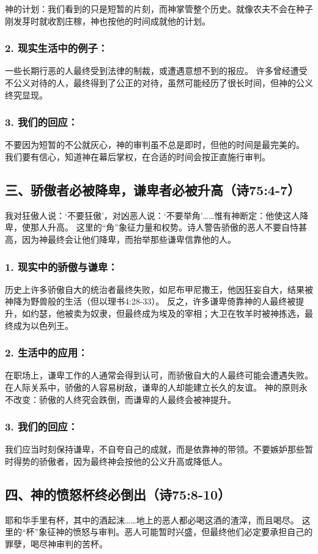 \documentclass[a4paper, 12pt]{article}
\begin{document}
神的计划：我们看到的只是短暂的片刻，而神掌管整个历史。就像农夫不会在种子刚发芽时就收割庄稼，神也按他的时间成就他的计划。
\subsubsection*{2. 现实生活中的例子：}
一些长期行恶的人最终受到法律的制裁，或遭遇意想不到的报应。
许多曾经遭受不公义对待的人，最终得到了公正的对待，虽然可能经历了很长时间，但神的公义终究显现。
\subsubsection*{3. 我们的回应：}
不要因为短暂的不公就灰心，神的审判虽不总是即时，但他的时间是最完美的。 我们要有信心，知道神在幕后掌权，在合适的时间会按正直施行审判。
\subsection*{三、骄傲者必被降卑，谦卑者必被升高（诗75:4-7）}
我对狂傲人说：‘不要狂傲’，对凶恶人说：‘不要举角’……惟有神断定：他使这人降卑，使那人升高。
这里的“角”象征力量和权势。诗人警告骄傲的恶人不要自恃甚高，因为神最终会让他们降卑，而抬举那些谦卑信靠他的人。
\subsubsection*{1. 现实中的骄傲与谦卑：}
历史上许多骄傲自大的统治者最终失败，如尼布甲尼撒王，他因狂妄自大，结果被神降为野兽般的生活（但以理书4:28-33）。
反之，许多谦卑倚靠神的人最终被提升，如约瑟，他被卖为奴隶，但最终成为埃及的宰相；大卫在牧羊时被神拣选，最终成为以色列王。
\subsubsection*{2. 生活中的应用：}
在职场上，谦卑工作的人通常会得到认可，而骄傲自大的人最终可能会遭遇失败。
在人际关系中，骄傲的人容易树敌，谦卑的人却能建立长久的友谊。
神的原则永不改变：骄傲的人终究会跌倒，而谦卑的人最终会被神提升。
\subsubsection*{3. 我们的回应：}
我们应当时刻保持谦卑，不自夸自己的成就，而是依靠神的带领。不要嫉妒那些暂时得势的骄傲者，因为最终神会按他的公义升高或降低人。
\subsection*{四、神的愤怒杯终必倒出（诗75:8-10）}
耶和华手里有杯，其中的酒起沫……地上的恶人都必喝这酒的渣滓，而且喝尽。
这里的“杯”象征神的愤怒与审判。恶人可能暂时兴盛，但最终他们必定要承担自己的罪孽，喝尽神审判的苦杯。
\end{document}
